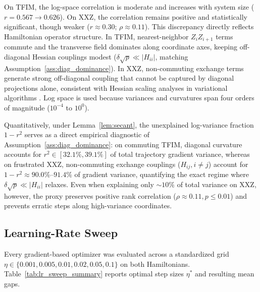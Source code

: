 \documentclass[11pt,a4paper]{article}
\begin{document}
On TFIM, the log-space correlation is moderate and increases with system size ($r = 0.567 \to 0.626$). On XXZ, the correlation remains positive and statistically significant, though weaker ($r \approx 0.30$; $\rho \approx 0.11$). This discrepancy directly reflects Hamiltonian operator structure. In TFIM, nearest-neighbor $Z_i Z_{i+1}$ terms commute and the transverse field dominates along coordinate axes, keeping off-diagonal Hessian couplings modest ($\delta \sqrt{p} \ll |H_{ii}|$, matching Assumption~\ref{ass:diag_dominance}). In XXZ, non-commuting exchange terms generate strong off-diagonal coupling that cannot be captured by diagonal projections alone, consistent with Hessian scaling analyses in variational algorithms \cite{hessian_resolvability_2026}. Log space is used because variances and curvatures span four orders of magnitude ($10^{-4}$ to $10^0$). 

Quantitatively, under Lemma~\ref{lem:secant}, the unexplained log-variance fraction $1 - r^2$ serves as a direct empirical diagnostic of Assumption~\ref{ass:diag_dominance}: on commuting TFIM, diagonal curvature accounts for $r^2 \in [32.1\%, 39.1\%]$ of total trajectory gradient variance, whereas on frustrated XXZ, non-commuting exchange couplings ($H_{ij}, i \ne j$) account for $1 - r^2 \approx 90.0\%\text{--}91.4\%$ of gradient variance, quantifying the exact regime where $\delta\sqrt{p} \ll |H_{ii}|$ relaxes. Even when explaining only $\sim 10\%$ of total variance on XXZ, however, the proxy preserves positive rank correlation ($\rho \approx 0.11, p \le 0.01$) and prevents erratic steps along high-variance coordinates.

\FloatBarrier

\subsection{Learning-Rate Sweep}
\label{sec:lr_sweep_results}
Every gradient-based optimizer was evaluated across a standardized grid $\eta \in \{0.001, 0.005, 0.01, 0.02, 0.05, 0.1\}$ on both Hamiltonians. Table~\ref{tab:lr_sweep_summary} reports optimal step sizes $\eta^*$ and resulting mean gaps.
\end{document}
